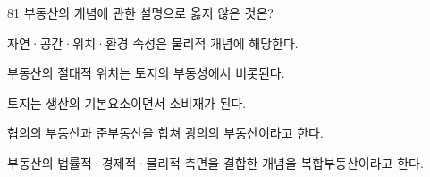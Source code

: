 \begin{question}{81}
부동산의 개념에 관한 설명으로 옳지 않은 것은?
\begin{choices}
  \item 자연·공간·위치·환경 속성은 물리적 개념에 해당한다.
  \item 부동산의 절대적 위치는 토지의 부동성에서 비롯된다.
  \item 토지는 생산의 기본요소이면서 소비재가 된다.
  \item 협의의 부동산과 준부동산을 합쳐 광의의 부동산이라고 한다.
  \item 부동산의 법률적·경제적·물리적 측면을 결합한 개념을 복합부동산이라고 한다.
\end{choices}
\end{question}
